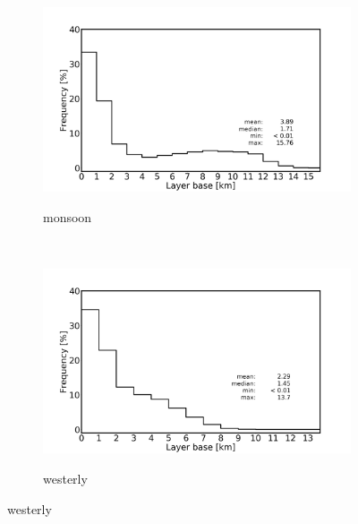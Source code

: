 \documentclass[alpha-refs]{wiley-article}
\begin{document}
\begin{figure}[!htbp]
    \begin{subfigure}[b]{0.5\textwidth}
        \centering
        \caption{monsoon}        
        \includegraphics[width=\textwidth]{layerbase_pdf_monsoondomain_monsoonseason.png}
           \label{fig:pdf1}
    \end{subfigure}%
    ~ 
    \begin{subfigure}[b]{0.5\textwidth}
        \centering
        \caption{westerly}        
        \includegraphics[width=\textwidth]{layerbase_pdf_westerlydomain_westerlyseason.png}
           \label{fig:pdf2}
    \end{subfigure}
    
        \bigskip
        

\end{figure}
\end{document}
